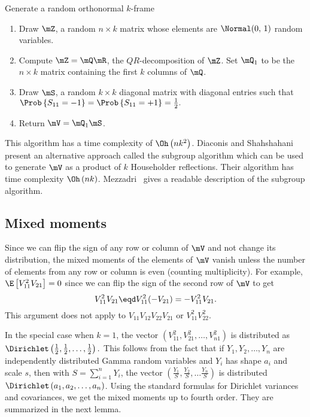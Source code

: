 \begin{algorithm}
    \caption{\label{A:random-steifel}Generate a random orthonormal $k$-frame}
    \begin{enumerate}
        \item Draw $\mZ$, a random $n \times k$ matrix whose elements are 
              \iid $\Normal( 0, \, 1 )$ random variables.
              
        \item Compute $\mZ = \mQ \mR$, the $QR$-decomposition of $\mZ$.
              Set $\mQ_1$ to be the $n \times k$ matrix containing the
              first $k$ columns of $\mQ$.

        \item Draw $\mS$, a random $k \times k$ diagonal matrix with \iid 
              diagonal entries such that 
              \(
                  \Prob\left\{ S_{11} = -1 \right\}
                  =
                  \Prob\left\{ S_{11} = +1 \right\}
                  =
                  \frac{1}{2}.
              \)
        \item Return $\mV = \mQ_1 \mS$.
    \end{enumerate}
\end{algorithm}

\noindent 
This algorithm has a time complexity of $\Oh\left( n k^2 \right)$. Diaconis
and Shahshahani~\cite{diaconis1987sag} present an alternative approach called
the subgroup algorithm which can be used to generate $\mV$ as a product of 
$k$ Householder reflections.  Their algorithm has time complexity 
$\Oh\left( n k \right)$.  Mezzadri~\cite{mezzadri2007grm} gives a readable 
description of the subgroup algorithm.


\subsection{Mixed moments}

Since we can flip the sign of any row or column of $\mV$ and not change
its distribution, the mixed moments of the elements of $\mV$ vanish unless 
the number of elements from any row or column is even (counting multiplicity).  For example, $\E \left[ V_{11}^2 V_{21} \right] = 0$ since we can flip the sign of the second row of $\mV$ to get
\[
    V_{11}^2 V_{21} 
    \eqd
    V_{11}^2 (- V_{21})
    =
    -V_{11}^2 V_{21}.
\]
This argument does not apply to $V_{11} V_{12} V_{22} V_{21}$ or
$V_{11}^2 V_{22}^2$.


In the special case when $k = 1$, the vector
\(
    \left(
        V_{11}^2, V_{21}^2, \ldots, V_{n1}^2
    \right)
\)
is distributed as 
\(
    \Dirichlet\left( \frac{1}{2}, \frac{1}{2}, \ldots, \frac{1}{2} \right).
\)
This follows from the fact that if $Y_1, Y_2, \ldots, Y_n$ are independently distributed Gamma random variables and $Y_i$ has shape
$a_i$ and scale $s$, then with $S = \sum_{i=1}^n Y_i$, the vector
\(
    \left(
        \frac{Y_1}{S},
        \frac{Y_2}{S},
        \ldots
        \frac{Y_n}{S}
    \right)
\)
is distributed $\Dirichlet\left( a_1, a_2, \ldots, a_n \right)$.  Using
the standard formulas for Dirichlet variances and covariances, we get
the mixed moments up to fourth order.  They are summarized in the next
lemma.

